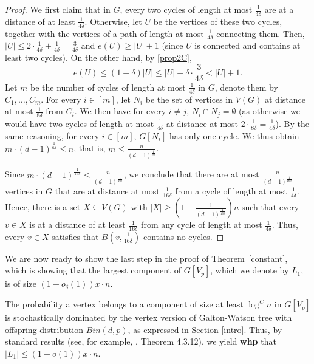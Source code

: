 \documentclass[notitlepage]{scrartcl}
\begin{document}
\begin{proof}
     We first claim that in $G$, every two cycles of length at most $\frac{1}{4\delta}$ are at a distance of at least $\frac{1}{4\delta}$. Otherwise, let $U$ be the vertices of these two cycles, together with the vertices of a path of length at most $\frac{1}{4\delta}$ connecting them. Then, $|U|\leq 2\cdot\frac{1}{4\delta}+\frac{1}{4\delta}=\frac{3}{4\delta}$ and $e(U)\geq |U|+1$ (since $U$ is connected and contains at least two cycles). On the other hand, by \ref{prop2C}, 
     $$e(U)\leq (1+\delta)|U|\leq |U|+\delta\cdot \frac{3}{4\delta}<|U|+1.$$
     Let $m$ be the number of cycles of length at most $\frac{1}{4\delta}$ in $G$, denote them by $C_1, \dots , C_m$. For every $i \in [m]$, let $N_i$ be the set of vertices in $V(G)$ at distance at most $\frac{1}{8\delta}$ from $C_i$. We then have for every $i\neq j$, $N_i\cap N_j=\emptyset$ (as otherwise we would have two cycles of length at most $\frac{1}{4\delta}$ at distance at most $2\cdot\frac{1}{8\delta}=\frac{1}{4\delta}$). By the same reasoning, for every $i \in [m]$, $G[N_i]$ has only one cycle. We thus obtain $m\cdot (d-1)^{\frac{1}{8\delta}}\leq n$, that is, $m \leq \frac{n}{(d-1)^{\frac{1}{8\delta}}}$.

     Since $m\cdot (d-1)^{\frac{1}{16\delta}}\leq \frac{n}{(d-1)^{\frac{1}{16\delta}}}$, we conclude that there are at most $\frac{n}{(d-1)^{\frac{1}{16\delta}}}$ vertices in $G$ that are at distance at most $\frac{1}{16\delta}$ from a cycle of length at most $\frac{1}{4\delta}$. Hence, there is a set $X \subseteq V(G)$ with $|X|\geq \left(1-\frac{1}{(d-1)^{\frac{1}{16\delta}}}\right)n$ such that every $v \in X$ is at a distance of at least $\frac{1}{16\delta}$ from any cycle of length at most $\frac{1}{4\delta}$. Thus, every $v \in X$ satisfies that $B\left(v,\frac{1}{16\delta}\right)$ contains no cycles.
\end{proof}

We are now ready to show the last step in the proof of Theorem~\ref{constant}, which is showing that the largest component of $G[V_p]$, which we denote by $L_1$, is of size $(1+o_\delta(1))x\cdot n$.

The probability a vertex belongs to a component of size at least $\log^C n$ in $G[V_p]$ is stochastically dominated by the vertex version of Galton-Watson tree with offspring distribution $Bin(d,p)$, as expressed in Section \ref{intro}. Thus, by standard results (see, for example, \cite{zbMATH06976511}, Theorem 4.3.12), we yield \textbf{whp} that $|L_1|\le (1+o(1))x\cdot n$.
\end{document}
